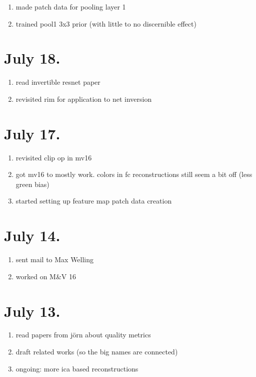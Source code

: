 \documentclass{article}
\begin{document}
\begin{enumerate}
	\item made patch data for pooling layer 1
	\item trained pool1 3x3 prior (with little to no discernible effect)
\end{enumerate}


\section*{July 18.}

\begin{enumerate}
	\item read invertible resnet paper
	\item revisited rim for application to net inversion
\end{enumerate}



\section*{July 17.}

\begin{enumerate}
	\item revisited clip op in mv16
	\item got mv16 to mostly work. colors in fc reconstructions still seem a bit off (less green bias)
	\item started setting up feature map patch data creation
\end{enumerate}


\section*{July 14.}

\begin{enumerate}
 	\item sent mail to Max Welling
 	\item worked on M\&V 16
\end{enumerate}

\section*{July 13.}

\begin{enumerate}
	\item read papers from jörn about quality metrics
	\item draft related works (so the big names are connected)
	\item ongoing: more ica based reconstructions
\end{enumerate}
	
\end{document}
